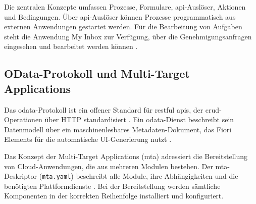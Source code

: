 Die zentralen Konzepte umfassen Prozesse, Formulare, \gls{api}-Auslöser, Aktionen und Bedingungen. Über \gls{api}-Auslöser können Prozesse programmatisch aus externen Anwendungen gestartet werden. Für die Bearbeitung von Aufgaben steht die Anwendung My Inbox zur Verfügung, über die Genehmigungsanfragen eingesehen und bearbeitet werden können \citep{freund2019bpmn}.

\subsection{OData-Protokoll und Multi-Target Applications}
\label{subsec:odata-mta}

Das \gls{odata}-Protokoll ist ein offener Standard für \gls{rest}ful \gls{api}s, der \gls{crud}-Operationen über HTTP standardisiert \citep{oasis2014odata}. Ein \gls{odata}-Dienst beschreibt sein Datenmodell über ein maschinenlesbares Metadaten-Dokument, das Fiori Elements für die automatische UI-Generierung nutzt \citep{tilkov2015rest}.

Das Konzept der Multi-Target Applications (\gls{mta}) adressiert die Bereitstellung von Cloud-Anwendungen, die aus mehreren Modulen bestehen. Der \gls{mta}-Deskriptor (\texttt{mta.yaml}) beschreibt alle Module, ihre Abhängigkeiten und die benötigten Plattformdienste \citep{sap2024mta}. Bei der Bereitstellung werden sämtliche Komponenten in der korrekten Reihenfolge installiert und konfiguriert.
